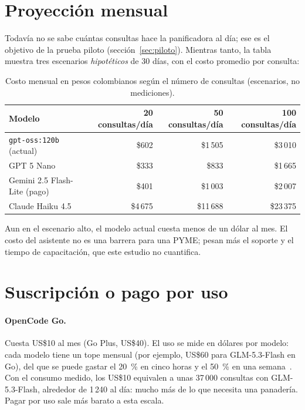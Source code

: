 \documentclass[letterpaper,11pt]{article}
\begin{document}
\section{Proyección mensual}

Todavía no se sabe cuántas consultas hace la panificadora al día; ese es el objetivo de la prueba piloto (sección~\ref{sec:piloto}). Mientras tanto, la tabla muestra tres escenarios \emph{hipotéticos} de 30 días, con el costo promedio por consulta:

\begin{table}[H]
\centering
\small
\begin{tabular}{lrrr}
\toprule
Modelo & 20 consultas/día & 50 consultas/día & 100 consultas/día \\
\midrule
\texttt{gpt-oss:120b} (actual) & \$602 & \$1\,505 & \$3\,010 \\
GPT 5 Nano & \$333 & \$833 & \$1\,665 \\
Gemini 2.5 Flash-Lite (pago) & \$401 & \$1\,003 & \$2\,007 \\
Claude Haiku 4.5 & \$4\,675 & \$11\,688 & \$23\,375 \\
\bottomrule
\end{tabular}
\caption{Costo mensual en pesos colombianos según el número de consultas (escenarios, no mediciones).}
\end{table}

Aun en el escenario alto, el modelo actual cuesta menos de un dólar al mes. El costo del asistente no es una barrera para una PYME; pesan más el soporte y el tiempo de capacitación, que este estudio no cuantifica.

\section{Suscripción o pago por uso}

\paragraph{OpenCode Go.} Cuesta US\$10 al mes (Go Plus, US\$40). El uso se mide en dólares por modelo: cada modelo tiene un tope mensual (por ejemplo, US\$60 para GLM-5.3-Flash en Go), del que se puede gastar el 20~\% en cinco horas y el 50~\% en una semana~\cite{opencodego}. Con el consumo medido, los US\$10 equivalen a unas 37\,000 consultas con GLM-5.3-Flash, alrededor de 1\,240 al día: mucho más de lo que necesita una panadería. Pagar por uso sale más barato a esta escala.
\end{document}
